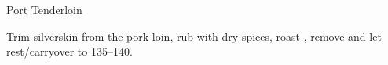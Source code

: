 
\begin{recipe}{Port Tenderloin}%
  \yield{}
  \servings{}
  \source{}
  \maketitle

  Trim silverskin from the pork loin, rub with dry spices, roast ,
  remove and let rest/carryover to 135--140\degF.
\end{recipe}

